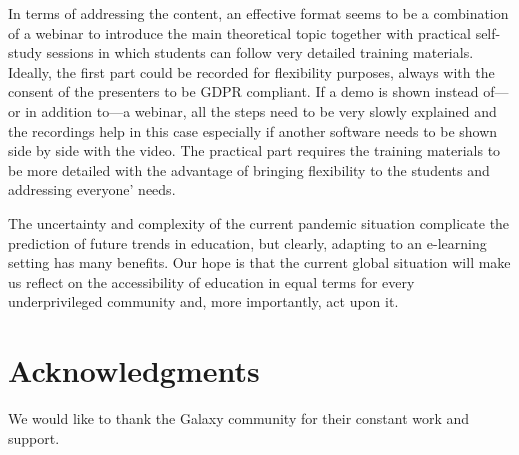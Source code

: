 In terms of addressing the content, an effective format seems to be a combination of a webinar to introduce the main theoretical topic together with practical self-study sessions in which students can follow very detailed training materials. Ideally, the first part could be recorded for flexibility purposes, always with the consent of the presenters to be GDPR compliant. If a demo is shown instead of—or in addition to—a webinar, all the steps need to be very slowly explained and the recordings help in this case especially if another software needs to be shown side by side with the video. The practical part requires the training materials to be more detailed with the advantage of bringing flexibility to the students and addressing everyone’ needs.

The uncertainty and complexity of the current pandemic situation complicate the prediction of future trends in education, but clearly, adapting to an e-learning setting has many benefits. Our hope is that the current global situation will make us reflect on the accessibility of education in equal terms for every underprivileged community and, more importantly, act upon it.

\section*{Acknowledgments}

We would like to thank the Galaxy community for their constant work and support.

\footnotesize


\normalsize

